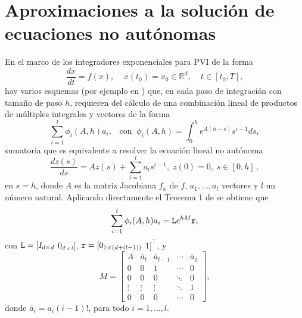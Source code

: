 \section{Aproximaciones a la solución de ecuaciones no autónomas}\label{section:approx-non-auto}
En el marco de los integradores exponenciales para PVI de la forma
\begin{equation*}
	\frac{dx}{dt}=f(x),  \;\;\;\; x(t_0)=x_0 \in \mathbb{R}^{d},   \;\;\;\; t\in[t_0,T],
\end{equation*}
hay varios esquemas (por ejemplo en \cite{tokman2006efficient,delaCruz07,hochbruck2011exponential}) que, en cada paso de integración con tamaño de paso $h$, requieren del cálculo de una combinación lineal de productos de múltiples integrales y vectores de la forma
\begin{equation*}
	\sum\limits_{i=1}^{l}\phi _{i}(A,h)a_{i},   \;\;\;\mathrm{con} \;\; \phi _{i}(A,h)=\int_{0}^{h}e^{A(h-s)}s^{i-1}ds,
\end{equation*}
sumatoria que es equivalente a resolver la ecuación lineal no autónoma \cite{delaCruz07,skaflestad2009scaling}
\begin{equation}\label{ODELinNoAut}
	\frac{dz(s)}{ds} = Az(s)+\sum\limits_{i=1}^{l}a_is^{i-1},\;z(0)=0,\;s\in [0,h]\, ,
\end{equation}
en $s=h$, donde $A$ es la matriz Jacobiana $f_x$ de $f$, $a_1,\ldots,a_l$ vectores y $l$ un número natural. 
Aplicando directamente el Teorema 1 de \cite{carbonell2008computing} se obtiene que \cite{carbonell2008computing,jimenez2006local}
\begin{equation}\label{sum2_phiXv}
\sum\limits_{i=1}^{l}\phi _{i}(A,h)a_{i} = \mathtt{L} e^{h M}\mathtt{r},
\end{equation}
con $\mathtt{L}=[I_{d\times d}$ $0_{d\times l}]$, $\mathtt{r}=[0_{1\times (d+(l-1))}$ $1]^{\intercal }$, y
\begin{equation*}
M=\left[
\begin{array}{ccccc}
A & \overline{a}_{l} & \overline{a}_{l-1} & \cdots & \overline{a}_{1} \\ 
0 & 0 & 1 & \cdots & 0 \\
0 & 0 & 0 & \ddots & 0 \\
\vdots & \vdots & \vdots & \ddots & 1 \\
0 & 0 & 0 & \cdots & 0
\end{array}%
\right],  \label{matrixH2}
\end{equation*}%
donde $\overline{a}_{i}=a_{i}(i-1)!$, para todo $i=1,\ldots ,l$.

